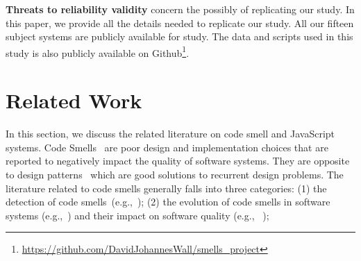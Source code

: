 \documentclass[smallcondensed]{svjour3}
\newcommand{\ea}{{et al.}}
\begin{document}
\textbf{Threats to reliability validity} concern the possibly of replicating our study. In this paper, we provide all the details needed to replicate our study. All our fifteen subject systems are publicly available for study. The data and scripts used in this study is also publicly available on Github\footnote{\url{https://github.com/DavidJohannesWall/smells_project}}.



\section{Related Work}\label{sec:related}
In this section, we discuss the related literature on code smell and JavaScript systems.
Code Smells~\cite{fowler1997refactoring} are poor design and implementation choices that are reported to negatively impact the quality of software systems. They are opposite to design patterns~\cite{Gam95} which are good solutions to recurrent design problems.
The literature related to code smells generally falls into three categories: (1) the detection of code smells~(e.g.,~\cite{Khomh11-BGB,fard2013jsnose}); (2) the evolution of code smells in software systems (e.g.,~\cite{chatzigeorgiou2010investigating,CodeSmells_overtime,peters2012evaluating,tufano2015and}) and their impact on software quality (e.g., ~\cite{shatnawi2006investigation,khomh2012exploratory,Abbes11,jaafar2013mining,tufano2015and,d2010impact,palomba2018diffuseness});
\end{document}
